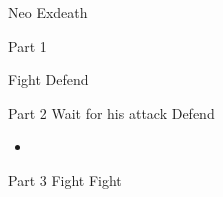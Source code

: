 \begin{paracol}{2}
\begin{boss}{Neo Exdeath}
    \varwb
    \begin{bossPart}{Part 1}
        \item {}
        \faris[\bossHl{(1x)}] \leftCommand{\blue} \then \ltwoOld
        \lenna[\bossHl{(1x)}] Fight \then {}
        \bartz[\bossHl{(1x)}] Defend
        \cara[\bossHl{(1x)}] \leftCommand{\kick}
    \end{bossPart}
    \begin{bossPart}{Part 2}
        \faris[\bossHl{(1x)}] Wait for his attack \then \leftCommand{\blue} \then \lfiveDeath[\newline]
         Defend
        \begin{itemize}
            \item {}
        \end{itemize}
        \bartz[\bossHl{(1x)}] \leftCommand{\gilToss}
        \cara[\bossHl{(1x)}] \leftCommand{\kick}
    \end{bossPart}
    \begin{bossPart}{Part 3}
        \bartz[\bossHl{(3x)}] \leftCommand{\gilToss}
        \cara[\bossHl{(1x)}] Fight \then {}
        \cara[\bossHl{(1x)}] \rightCommand{\gilToss}
        \cara[\bossHl{(1x)}] Fight \then {}
    \end{bossPart}
    \varwe
\end{boss}

\end{paracol}
